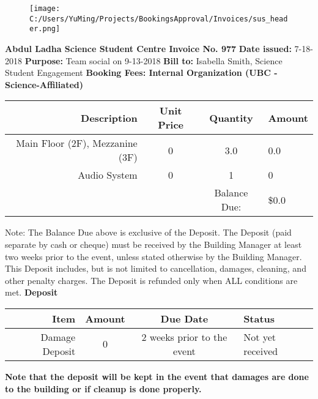 \documentclass{article}%
\begin{document}
%
\normalsize%
\noindent%


\begin{figure}[h!]%
\centering%
\centering%
\texttt{[image: C:/Users/YuMing/Projects/BookingsApproval/Invoices/sus\_header.png]}%
\end{figure}

%
\textbf{ }%
\newline%
\textbf{Abdul Ladha Science Student Centre Invoice No. 977}%
\newline%
\textbf{Date issued: }%
7{-}18{-}2018%
\newline%
\textbf{Purpose: }%
Team social on 9{-}13{-}2018%
\newline%
\textbf{Bill to: }%
Isabella Smith, Science Student Engagement%
\newline%
\newline%
\textbf{Booking Fees: Internal Organization (UBC {-} Science{-}Affiliated)}%
\newline%
\begin{tabular}{|r|ccl|}%
\hline%
Description&Unit Price&Quantity&Amount\\%
\hline%
Main Floor (2F), Mezzanine (3F)&0&3.0&0.0\\%
\hline%
Audio System&0&1&0\\%
\hline%
&&Balance Due:&\$0.0\\%
\hline%
\end{tabular}%
\newline%
\newline%
Note: The Balance Due above is exclusive of the Deposit.         The Deposit (paid separate by cash or cheque) must be received by the Building Manager         at least two weeks prior to the event, unless stated otherwise by the Building Manager.         This Deposit includes, but is not limited to cancellation, damages, cleaning, and other penalty charges.         The Deposit is refunded only when ALL conditions are met.%
\newline%
\newline%
\textbf{Deposit}%
\newline%
\begin{tabular}{|r|c|c|l|}%
\hline%
Item&Amount&Due Date&Status\\%
\hline%
Damage Deposit&0&2 weeks prior to the event&Not yet received\\%
\hline%
\end{tabular}%
\newline%
\newline%
\textbf{Note that the deposit will be kept in the event that damages are done to the building                             or if cleanup is done properly.}%
\end{document}
